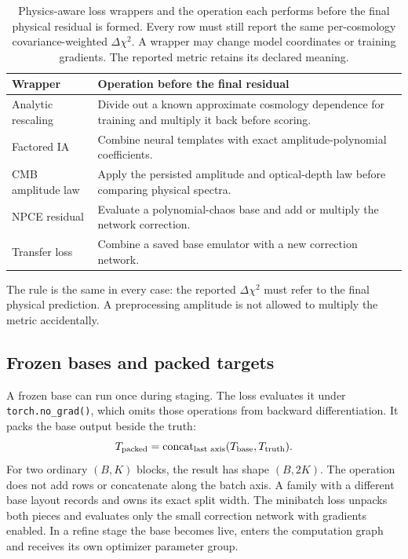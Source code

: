 \documentclass[10pt,aps,prd,twocolumn,nofootinbib]{revtex4-2}
\newcommand{\code}[1]{\texttt{#1}}
\begin{document}
\begin{table}[t]
\centering
\begin{tabular}{p{}p{}}
\toprule
Wrapper & Operation before the final residual \\
\midrule
Analytic rescaling & Divide out a known approximate cosmology dependence for
training and multiply it back before scoring.  \\
Factored IA & Combine neural templates with exact amplitude-polynomial
coefficients.  \\
CMB amplitude law & Apply the persisted amplitude and optical-depth law before
comparing physical spectra.  \\
NPCE residual & Evaluate a polynomial-chaos base and add or multiply the
network correction.  \\
Transfer loss & Combine a saved base emulator with a new correction network.  \\
\bottomrule
\end{tabular}
\caption{Physics-aware loss wrappers and the operation each performs before
the final physical residual is formed.  Every row must still report the same
per-cosmology covariance-weighted $\Delta\chi^2$.  A wrapper may change model
coordinates or training gradients.  The reported metric retains its declared
meaning.}
\label{tab:loss-wrappers}
\end{table}

The rule is the same in every case: the reported $\Delta\chi^2$ must refer to
the final physical prediction.  A preprocessing amplitude is not allowed to
multiply the metric accidentally.

\subsection{Frozen bases and packed targets}

A frozen base can run once during staging.  The loss evaluates it under
\code{torch.no\_grad()}, which omits those operations from backward
differentiation.  It packs the base output
beside the truth:
\begin{equation*}
  T_{\rm packed}=\operatorname{concat}_{\text{last axis}}
  (T_{\rm base},T_{\rm truth}).
\end{equation*}
For two ordinary $(B,K)$ blocks, the result has shape $(B,2K)$.  The operation
does not add rows or concatenate along the batch axis.  A family with a
different base layout records and owns its exact split width.
The minibatch loss unpacks both pieces and evaluates only the small correction
network with gradients enabled.  In a refine stage the base becomes live,
enters the computation graph and receives its own optimizer parameter group.
\end{document}
